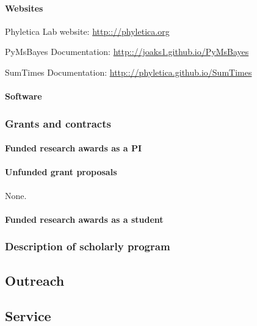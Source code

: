 \paragraph{Websites}
\begin{tightItemize}
    \item Phyletica Lab website: \url{http:://phyletica.org}
    \item PyMsBayes Documentation: \url{http:://joaks1.github.io/PyMsBayes}
    \item SumTimes Documentation: \url{http:://phyletica.github.io/SumTimes}
\end{tightItemize}

\paragraph{Software}


\subsubsection{Grants and contracts}

\paragraph{Funded research awards as a PI}


\paragraph{Unfunded grant proposals}
None.

\paragraph{Funded research awards as a student}


\subsubsection{Description of scholarly program}


\subsection{Outreach}


\subsection{Service}

